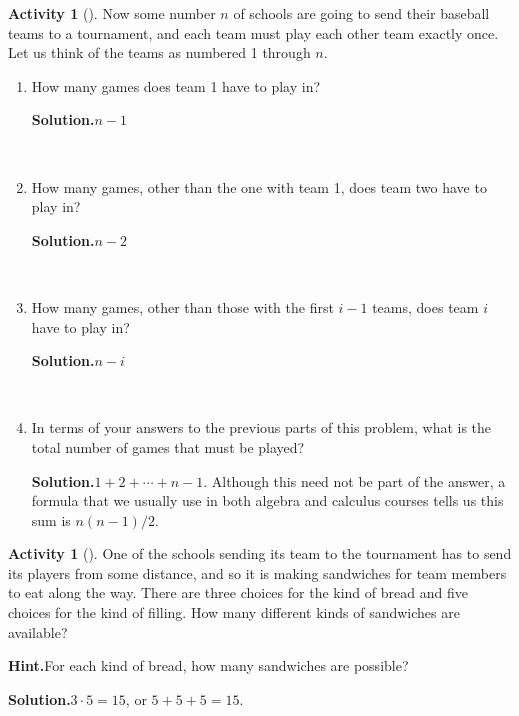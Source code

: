 \documentclass[10pt,]{book}
\theoremstyle{plain}
\theoremstyle{definition}
\newtheorem{activity}[project]{Activity}
\numberwithin{equation}{chapter}
\begin{document}
\begin{activity}[]\label{baseball2}
Now some number \(n\) of schools are going to send their baseball teams to a tournament, and each team must play each other team exactly once. Let us think of the teams as numbered 1 through \(n\).%
~\par
\begin{enumerate}[label=(\alph*)]
 \item How many games does  team 1 have to play in?%
\par\medskip\noindent%
\textbf{Solution.}\quad \(n-1\)%

~\par
\item How many games, other than the one with team 1, does team two have to play in?%
\par\medskip\noindent%
\textbf{Solution.}\quad \(n-2\)%

~\par
\item How many games, other than those with the first \(i-1\) teams, does team \(i\) have to play in?%
\par\medskip\noindent%
\textbf{Solution.}\quad \(n-i\)%

~\par
\item In terms of your answers to the previous parts of this problem, what is the total number of games that must be played?%
\par\medskip\noindent%
\textbf{Solution.}\quad \(1+2 +\cdots+ n-1\). Although this need not be part of the answer, a formula that we usually use in both algebra and calculus courses tells us this sum is \(n(n-1)/2\).%

\end{enumerate}
\end{activity}
\begin{activity}[]\label{basicsandwiches}
One of the schools sending its team to the tournament has to send its players from some distance, and so it is making sandwiches for team members to eat along the way. There are three choices for the kind of bread and five choices for the kind of filling. How many different kinds of sandwiches are available?%
\par\medskip\noindent%
\textbf{Hint.}\quad For each kind of bread, how many sandwiches are possible?%
\par\medskip\noindent%
\textbf{Solution.}\quad \(3\cdot5=15\), or \(5+5+5=15\).%
\end{activity}
\end{document}
